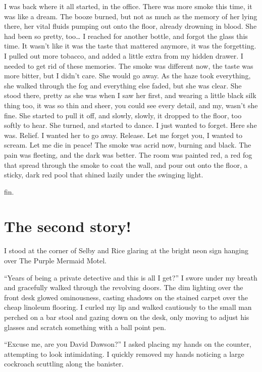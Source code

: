 I was back where it all started, in the office. There was more
smoke this time, it was like a dream. The booze burned, but not as
much as the memory of her lying there, her vital fluids pumping out
onto the floor, already drowning in blood. She had been so pretty,
too{\ldots} I reached for another bottle, and forgot the glass this
time. It wasn't like it was the taste that mattered anymore, it was
the forgetting. I pulled out more tobacco, and added a little extra
from my hidden drawer. I needed to get rid of these memories. The
smoke was different now, the taste was more bitter, but I didn't
care. She would go away. As the haze took everything, she walked
through the fog and everything else faded, but she was clear. She
stood there, pretty as she was when I saw her first, and wearing a
little black silk thing too, it was so thin and sheer, you could
see every detail, and my, wasn't she fine. She started to pull it
off, and slowly, slowly, it dropped to the floor, too softly to
hear. She turned, and started to dance. I just wanted to forget.
Here she was. Relief. I wanted her to go away. Release. Let me
forget you, I wanted to scream. Let me die in peace! The smoke was
acrid now, burning and black. The pain was fleeting, and the dark
was better. The room was painted red, a red fog that spread through
the smoke to coat the wall, and pour out onto the floor, a sticky,
dark red pool that shined lazily under the swinging light.

fin.





\section*{The second story!}





I stood at the corner of Selby and Rice glaring at the bright neon
sign hanging over The Purple Mermaid Motel.

``Years of being a private detective and this is all I
get?'' I swore under my breath and gracefully walked through
the revolving doors. The dim lighting over the front desk glowed
ominousness, casting shadows on the stained carpet over the cheap
linoleum flooring. I curled my lip and walked cautiously to the
small man perched on a bar stool and gazing down on the desk, only
moving to adjust his glasses and scratch something with a ball
point pen.

``Excuse me, are you David Dawson?'' I asked placing my
hands on the counter, attempting to look intimidating. I quickly
removed my hands noticing a large cockroach scuttling along the
banister.

